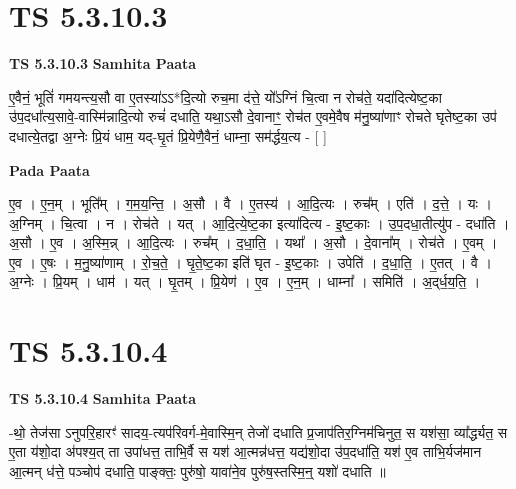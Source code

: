\documentclass[17pt]{extarticle}
\begin{document}
\section*{ TS 5.3.10.3 }

\textbf{TS 5.3.10.3 } \newline
\textbf{Samhita Paata} \newline

ए॒वैनं॒ भूतिं॑ गमयन्त्य॒सौ वा ए॒तस्या॑ऽऽ*दि॒त्यो रुच॒मा द॑त्ते॒ यो᳚ऽग्निं चि॒त्वा न रोच॑ते॒ यदा॑दित्येष्ट॒का उ॑प॒दधा᳚त्य॒सावे॒-वास्मि॑न्नादि॒त्यो रुचं॑ दधाति॒ यथा॒ऽसौ दे॒वानाꣳ॒॒ रोच॑त ए॒वमे॒वैष म॑नु॒ष्या॑णाꣳ रोचते घृतेष्ट॒का उप॑ दधात्ये॒तद्वा अ॒ग्नेः प्रि॒यं धाम॒ यद्-घृ॒तं प्रि॒येणै॒वैनं॒ धाम्ना॒ सम॑र्द्धय॒त्य - [  ] \newline

\textbf{Pada Paata} \newline

ए॒व । ए॒न॒म् । भूति᳚म् । ग॒म॒य॒न्ति॒ । अ॒सौ । वै । ए॒तस्य॑ । आ॒दि॒त्यः । रुच᳚म् । एति॑ । द॒त्ते॒ । यः । अ॒ग्निम् । चि॒त्वा । न । रोच॑ते । यत् । आ॒दि॒त्ये॒ष्ट॒का इत्या॑दित्य - इ॒ष्ट॒काः । उ॒प॒दधा॒तीत्यु॑प - दधा॑ति । अ॒सौ । ए॒व । अ॒स्मि॒न्न् । आ॒दि॒त्यः । रुच᳚म् । द॒धा॒ति॒ । यथा᳚ । अ॒सौ । दे॒वाना᳚म् । रोच॑ते । ए॒वम् । ए॒व । ए॒षः । म॒नु॒ष्या॑णाम् । रो॒च॒ते॒ । घृ॒ते॒ष्ट॒का इति॑ घृत - इ॒ष्ट॒काः । उपेति॑ । द॒धा॒ति॒ । ए॒तत् । वै । अ॒ग्नेः । प्रि॒यम् । धाम॑ । यत् । घृ॒तम् । प्रि॒येण॑ । ए॒व । ए॒न॒म् । धाम्ना᳚ । समिति॑ । अ॒द्‌र्ध॒य॒ति॒ ।  \newline




\section*{ TS 5.3.10.4 }

\textbf{TS 5.3.10.4 } \newline
\textbf{Samhita Paata} \newline

-थो॒ तेज॑सा ऽनुपरि॒हारꣳ॑ सादय॒-त्यप॑रिवर्ग-मे॒वास्मि॒न् तेजो॑ दधाति प्र॒जाप॑तिर॒ग्निम॑चिनुत॒ स यश॑सा॒ व्या᳚र्द्ध्यत॒ स ए॒ता य॑शो॒दा अ॑पश्य॒त् ता उपा॑धत्त॒ ताभि॒र्वै स यश॑ आ॒त्मन्न॑धत्त॒ यद्य॑शो॒दा उ॑प॒दधा॑ति॒ यश॑ ए॒व ताभि॒र्यज॑मान आ॒त्मन् ध॑त्ते॒ पञ्चोप॑ दधाति॒ पाङ्क्तः॒ पुरु॑षो॒ यावा॑ने॒व पुरु॑ष॒स्तस्मि॒न्॒ यशो॑ दधाति ॥ \newline
\end{document}
